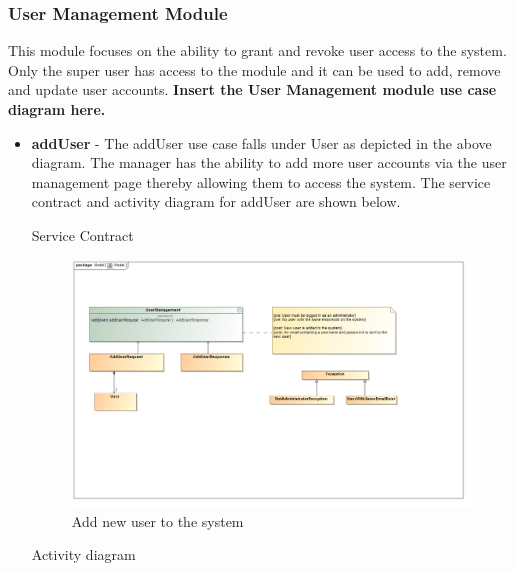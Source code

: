 \documentclass[english]{article}
\begin{document}
		\subsubsection{User Management Module}
		This module focuses on the ability to grant and revoke user access to the system. Only the super user has access to the module and it can be used to add, remove and update user accounts.
		\textbf{Insert the User Management module use case diagram here.} \newline
		\begin{itemize}
	  		\item \textbf{addUser} -  The addUser use case falls under User as depicted in the above diagram. The manager has the ability to add more user accounts via the user management page thereby allowing them to access the system. The service contract and activity diagram for addUser are shown below.
	  		
				\begin{center}
	  			Service Contract
	  		    \end{center}
	  		    
	  			\begin{figure}[H]
	  				\begin{center}
	  					\includegraphics[scale=0.25]{AddUserContract.jpg}
	  				\end{center}
	  				\caption{Add new user to the system}
	  				
	  			\end{figure}
	  		
	  			
	  			\begin{center}
	  				Activity diagram
	  			\end{center}
	  			

\end{itemize}
\end{document}
